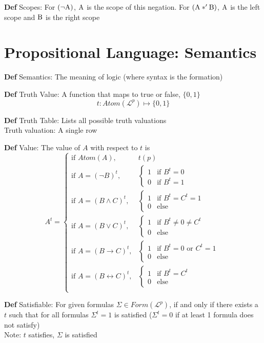 \documentclass[11pt,notitlepage]{report}
\newcommand{\mc}[1]{\ensuremath{\mathcal{#1}}}
\newcommand{\tbf}[1]{\textbf{#1}}
\begin{document}
\tbf{Def} Scopes: For $(\neg \rm A)$, $\rm A$ is the scope of this negation. For $(\rm A *' \rm B)$, $\rm A$ is the left scope and $\rm B$ is the right scope


\section{Propositional Language: Semantics}

\textbf{Def} Semantics: The meaning of logic (where syntax is the formation)

\textbf{Def} Truth Value: A function that maps to true or false, $\{0, 1\}$
$$t: Atom(\mc L^p) \mapsto \{0, 1\}$$

\textbf{Def} Truth Table: Lists all possible truth valuations\\
\hspace*{5mm} Truth valuation: A single row

\textbf{Def} Value: The value of $A$ with respect to $t$ is
$$A^t = \begin{cases}\text{if }Atom(A), &t(p)\\
\text{if } A = (\neg B)^t, &\begin{cases}1 & \text{if }B^t = 0\\0 & \text{if }B^t = 1\end{cases}\\
\text{if } A = (B \wedge C)^t, &\begin{cases}1 & \text{if }B^t = C^t = 1\\0 & \text{else}\end{cases}\\
\text{if } A = (B \vee C)^t, &\begin{cases}1 & \text{if }B^t \ne 0 \ne C^t\\0 & \text{else}\end{cases}\\
\text{if } A = (B \to C)^t, &\begin{cases}1 & \text{if }B^t = 0 \text{ or } C^t = 1\\0 & \text{else}\end{cases}\\
\text{if } A = (B \leftrightarrow C)^t, &\begin{cases}1 & \text{if }B^t = C^t\\0 & \text{else}\end{cases}\\
\end{cases}$$


\textbf{Def} Satisfiable: For given formulas $\Sigma \in Form(\mc L^p)$, if and only if there exists a $t$ such that for all formulas $\Sigma^t = 1$ is satisfied ($\Sigma^t = 0$ if at least 1 formula does not satisfy)\\
\hspace*{5mm} Note: $t$ satisfies, $\Sigma$ is satisfied
\end{document}
